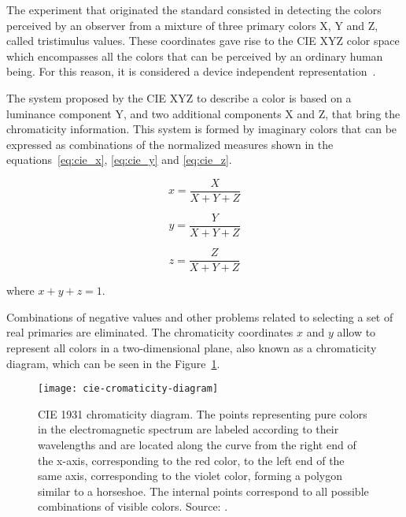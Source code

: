 The experiment that originated the standard consisted in detecting the colors perceived by an observer from a mixture of three primary colors X, Y and Z, called tristimulus values. These coordinates gave rise to the CIE XYZ color space which encompasses all the colors that can be perceived by an ordinary human being. For this reason, it is considered a device independent representation~\citep{konstantinos:00}.

The system proposed by the CIE XYZ to describe a color is based on a luminance component Y, and two additional components X and Z, that bring the chromaticity information. This system is formed by imaginary colors that can be expressed as combinations of the normalized measures shown in the equations~\ref{eq:cie_x}, \ref{eq:cie_y} and \ref{eq:cie_z}.

\newpage
\begin{equation}
  x = \frac{X}{X + Y + Z}
\label{eq:cie_x}
\end{equation}

\begin{equation}
  y = \frac{Y}{X + Y + Z}
\label{eq:cie_y}
\end{equation}

\begin{equation}
  z = \frac{Z}{X + Y + Z}
\label{eq:cie_z}
\end{equation}

where $x + y+ z = 1$.

Combinations of negative values and other problems related to selecting a set of real primaries are eliminated. The chromaticity coordinates $x$ and $y$ allow to represent all colors in a two-dimensional plane, also known as a chromaticity diagram, which can be seen in the Figure~\ref{fig:cie-cromaticity-diagram}.

\begin{figure}[!ht]
  \centering
  \texttt{[image: cie-cromaticity-diagram]}
  \caption[CIE 1931 chromaticity diagram]{CIE 1931 chromaticity diagram. The points representing pure colors in the electromagnetic spectrum are labeled according to their wavelengths and are located along the curve from the right end of the x-axis, corresponding to the red color, to the left end of the same axis, corresponding to the violet color, forming a polygon similar to a horseshoe. The internal points correspond to all possible combinations of visible colors. Source: \citet{ben:09}.}
  \label{fig:cie-cromaticity-diagram} 
\end{figure}

